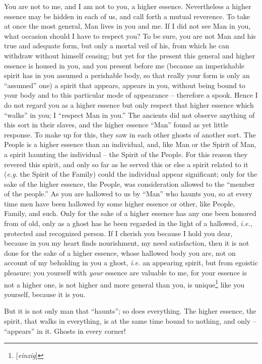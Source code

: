 \documentclass[12pt,a4paper]{book}
\begin{document}
You are not to me, and I am not to you, a higher essence. Nevertheless a 
higher essence may be hidden in each of us, and call forth a mutual reverence. 
To take at once the most general, Man lives in you and me. If I did not see 
Man in you, what occasion should I have to respect you? To be sure, you are 
not Man and his true and adequate form, but only a mortal veil of his, from 
which he can withdraw without himself ceasing; but yet for the present this 
general and higher essence is housed in you, and you present before me 
(because an imperishable spirit has in you assumed a perishable body, so that 
really your form is only an ``assumed'' one) a spirit that appears, appears 
in you, without being bound to your body and to this particular mode of 
appearance -- therefore a spook. Hence I do not regard you as a higher essence 
but only respect that higher essence which ``walks'' in you; I ``respect 
Man in you.'' The ancients did not observe anything of this sort in their 
slaves, and the higher essence ``Man'' found as yet little response. To make 
up for this, they saw in each other ghosts of another sort. The People is a 
higher essence than an individual, and, like Man or the Spirit of Man, a 
spirit haunting the individual -- the Spirit of the People. For this reason 
they revered this spirit, and only so far as he served this or else a spirit 
related to it (\textit{e.g.} the Spirit of the Family) could the individual 
appear significant; only for the sake of the higher essence, the People, was 
consideration allowed to the ``member of the people.'' As you are hallowed 
to us by ``Man'' who haunts you, so at every time men have been hallowed by 
some higher essence or other, like People, Family, and such. Only for the sake 
of a higher essence has any one been honored from of old, only as a ghost has 
he been regarded in the light of a hallowed, \textit{i.e.}, protected and 
recognized person. If I cherish you because I hold you dear, because in you my 
heart finds nourishment, my need satisfaction, then it is not done for the 
sake of a higher essence, whose hallowed body you are, not on account of my 
beholding in you a ghost, \textit{i.e.} an appearing spirit, but from egoistic 
pleasure; you yourself with \textit{your} essence are valuable to me, for your 
essence is not a higher one, is not higher and more general than you, is 
unique\footnote{[\textit{einzig}]} like you yourself, because it is you.

But it is not only man that ``haunts''; so does everything. The higher 
essence, the spirit, that walks in everything, is at the same time bound to 
nothing, and only -- ``appears'' in it. Ghosts in every corner!
\end{document}
